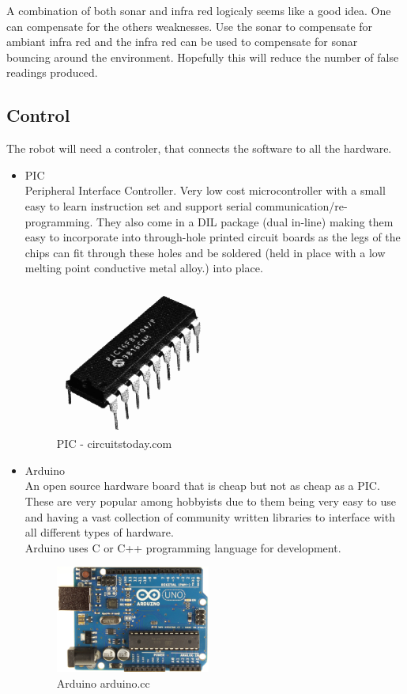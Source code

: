 A combination of both sonar and infra red logicaly seems like a good idea.  One can compensate for the others weaknesses.  Use the sonar to compensate for ambiant infra red and the infra red can be used to compensate for sonar bouncing around the environment.  Hopefully this will reduce the number of false readings produced.
\subsection{Control}
The robot will need a controler, that connects the software to all the hardware.
\begin{itemize}
\item PIC
\\Peripheral Interface Controller.  Very low cost microcontroller with a small easy to learn instruction set and support serial communication/re-programming.  They also come in a DIL package (dual in-line) making them easy to incorporate into through-hole printed circuit boards as the legs of the chips can fit through these holes and be soldered (held in place with a low melting point conductive metal alloy.) into place.
\begin{figure}[h]
\centering
        \includegraphics[width=2.0in] {Images/pic-chip.png}
        \caption{PIC - circuitstoday.com}
        \label{PIC}
\end{figure}

\item Arduino
\\An open source hardware board that is cheap but not as cheap as a PIC.  These are very popular among hobbyists due to them being very easy to use and having a vast collection of community written libraries to interface with all different types of hardware.
\\Arduino uses C or C++ programming language for development.
\begin{figure}[h]
\centering
        \includegraphics[width=2.0in] {Images/arduinouno-r3.jpg}
        \caption{Arduino arduino.cc}
        \label{Arduino}
\end{figure}


\end{itemize}
